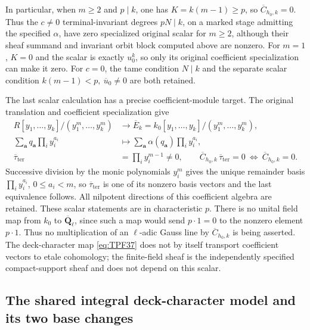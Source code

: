 In particular, when \(m\ge2\) and \(p\mid k\),
one has \(K=k(m-1)\ge p\), so
\(\overline C_{h_0,k}=0\). Thus the \(c\ne0\)
terminal-invariant degrees \(pN\mid k\), on
a marked stage admitting the specified
\(\alpha\), have zero specialized original
scalar for \(m\ge2\),
although their sheaf summand and invariant
orbit block computed above are nonzero.
For \(m=1\), \(K=0\) and the scalar is exactly
\(u_0^k\), so only its original coefficient
specialization can make it zero.
For \(c=0\), the tame condition \(N\mid k\)
and the separate scalar condition
\(k(m-1)<p,\ \overline u_0\ne0\) are both
retained.

The last scalar calculation has a precise
coefficient-module target. The original
translation and coefficient specialization give
\[
 \begin{split}
 R[y_1,\ldots,y_k]/(y_1^m,\ldots,y_k^m)
    &\longrightarrow
 \overline E_k
   =k_0[y_1,\ldots,y_k]/(y_1^m,\ldots,y_k^m),\\
 \sum_{\boldsymbol a}q_{\boldsymbol a}
                         \prod_i y_i^{a_i}
    &\longmapsto
       \sum_{\boldsymbol a}\alpha(q_{\boldsymbol a})
                         \prod_i y_i^{a_i},\\
 \overline\tau_{\mathrm{ter}}&=\prod_i y_i^{m-1}\ne0,\qquad
 \overline C_{h_0,k}\,\overline\tau_{\mathrm{ter}}=0
       \ \Longleftrightarrow\ \overline C_{h_0,k}=0 .
 \end{split}
 \tag{TPF.43}\label{eq:TPF43}
\]
Successive division by the monic polynomials
\(y_i^m\) gives the unique remainder basis
\(\prod_i y_i^{a_i}\), \(0\le a_i<m\), so
\(\overline\tau_{\mathrm{ter}}\) is one of its nonzero basis
vectors and the last equivalence follows.
All nilpotent directions of this coefficient
algebra are retained. These scalar statements
are in characteristic \(p\). There is no
unital field map from \(k_0\) to
\(\overline{\mathbf Q}_\ell\), since such a
map would send \(p\cdot1=0\) to the nonzero
element \(p\cdot1\). Thus no multiplication
of an \(\ell\)-adic Gauss line by
\(\overline C_{h_0,k}\) is being asserted.
The deck-character map \eqref{eq:TPF37}
does not by itself transport coefficient
vectors to etale cohomology; the
finite-field sheaf is the independently
specified compact-support sheaf and does
not depend on this scalar.

\subsection{The shared integral deck-character model and its two base changes}

